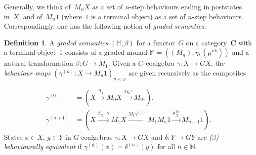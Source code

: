 \documentclass[11pt,a4paper]{amsart}
\theoremstyle{plain}
\numberwithin{equation}{section}
\newcommand{\Nat}{{\mathbb{N}}}
\newcommand{\monad}{{\mathbb{M}}}
\newcommand{\+}[1]{\mathcal{#1}\xspace}
\newcommand{\BC}{\mathbf{C}}
\theoremstyle{definition}
\newtheorem{defn}[defn]{Definition}
\begin{document}
  Generally, we think of~$M_nX$ as a set of $n$-step behaviours ending
  in poststates in~$X$, and of~$M_n1$ (where~$1$ is a terminal object)
  as a set of $n$-step behaviours. Correspondingly, one has the
  following notion of \emph{graded semantics}:
  \begin{defn}\label{defn:graded-semantics}
    A \emph{graded semantics} $(\monad,\beta)$ for a functor~$G$ on a
    category~$\BC$ with a terminal object~$1$ consists of a graded
    monad \(\monad=((M_n), \eta, (\mu^{nk}))\) and a natural
    transformation \(\beta: G \to M_1\).  Given a \(G\)-coalgebra
    \(\gamma\colon X \to GX\), the \emph{behaviour maps}
    $(\gamma^{(n)}\colon X\to M_n1)_{n<\omega}$ are given recursively as the composites    

    \begin{align*}
        \gamma^{(0)} & = (X \xrightarrow{\eta_X} M_0X \xrightarrow{M_0!} M_01), \\
        \gamma^{(n + 1)}&  = (X \xrightarrow{\beta_X \cdot \gamma} M_1X \xrightarrow{M_1\gamma^{(n)}} M_1M_n1 \xrightarrow{\mu^{1n}_X} M_{n+1}1).
    \end{align*}
    States $x\in X$, $y\in Y$ in $G$-coalgebras
    \(\gamma\colon X \to GX\) and $\delta\colon Y\to GY$ are
    \emph{($\beta$)-behaviourally equivalent} if
    \(\gamma^{(n)}(x) = \delta^{(n)}(y)\) for all \(n \in \Nat\).
\end{defn}
\end{document}
